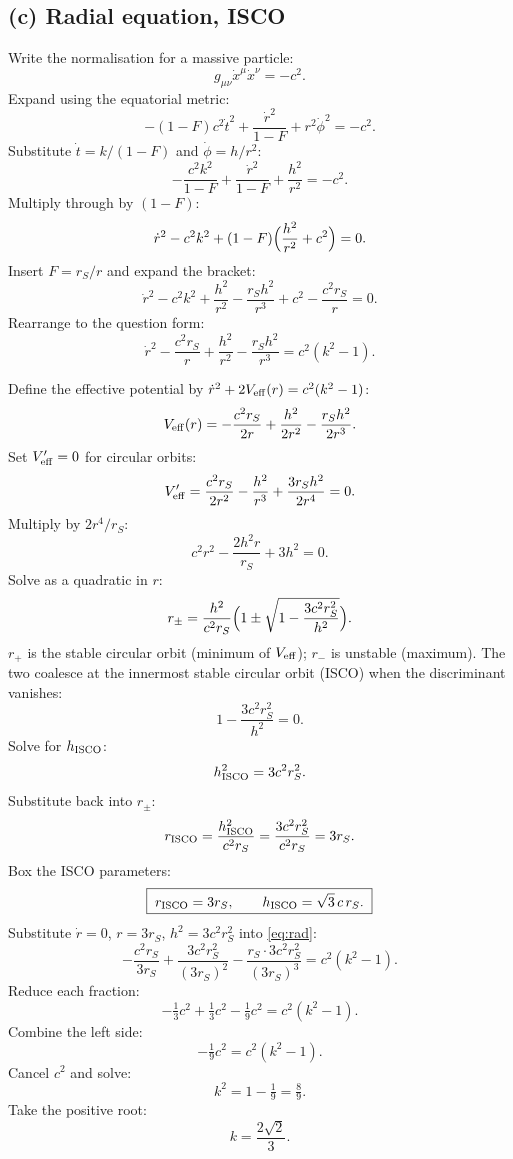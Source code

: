 \documentclass[11pt]{article}
\begin{document}
\subsection*{(c) Radial equation, ISCO}

Write the normalisation for a massive particle:
\[
g_{\mu\nu}\dot x^{\mu}\dot x^{\nu}=-c^{2}.
\]
Expand using the equatorial metric:
\[
-(1-F)c^{2}\dot t^{2}+\frac{\dot r^{2}}{1-F}+r^{2}\dot\phi^{2}=-c^{2}.
\]
Substitute $\dot t=k/(1-F)$ and $\dot\phi=h/r^{2}$:
\[
-\frac{c^{2}k^{2}}{1-F}+\frac{\dot r^{2}}{1-F}+\frac{h^{2}}{r^{2}}=-c^{2}.
\]
Multiply through by $(1-F)$:
\[
\dot r^{2}-c^{2}k^{2}+(1-F)\Bigl(\frac{h^{2}}{r^{2}}+c^{2}\Bigr)=0.
\]
Insert $F=r_{S}/r$ and expand the bracket:
\[
\dot r^{2}-c^{2}k^{2}+\frac{h^{2}}{r^{2}}-\frac{r_{S}h^{2}}{r^{3}}+c^{2}-\frac{c^{2}r_{S}}{r}=0.
\]
Rearrange to the question form:
\begin{equation}
\boxed{\;\dot r^{2}-\frac{c^{2}r_{S}}{r}+\frac{h^{2}}{r^{2}}-\frac{r_{S}h^{2}}{r^{3}}=c^{2}(k^{2}-1).\;}
\label{eq:rad}
\end{equation}

Define the effective potential by $\dot r^{2}+2V_{\rm eff}(r)=c^{2}(k^{2}-1)$:
\[
V_{\rm eff}(r)=-\frac{c^{2}r_{S}}{2r}+\frac{h^{2}}{2r^{2}}-\frac{r_{S}h^{2}}{2r^{3}}.
\]
Set $V'_{\rm eff}=0$ for circular orbits:
\[
V'_{\rm eff}=\frac{c^{2}r_{S}}{2r^{2}}-\frac{h^{2}}{r^{3}}+\frac{3r_{S}h^{2}}{2r^{4}}=0.
\]
Multiply by $2r^{4}/r_{S}$:
\[
c^{2}r^{2}-\frac{2h^{2}r}{r_{S}}+3h^{2}=0.
\]
Solve as a quadratic in $r$:
\[
r_{\pm}=\frac{h^{2}}{c^{2}r_{S}}\Bigl(1\pm\sqrt{1-\frac{3c^{2}r_{S}^{2}}{h^{2}}}\Bigr).
\]
$r_{+}$ is the stable circular orbit (minimum of $V_{\rm eff}$); $r_{-}$ is unstable (maximum).  The two coalesce at the innermost stable circular orbit (ISCO) when the discriminant vanishes:
\[
1-\frac{3c^{2}r_{S}^{2}}{h^{2}}=0.
\]
Solve for $h_{\rm ISCO}$:
\[
h_{\rm ISCO}^{2}=3c^{2}r_{S}^{2}.
\]
Substitute back into $r_{\pm}$:
\[
r_{\rm ISCO}=\frac{h_{\rm ISCO}^{2}}{c^{2}r_{S}}=\frac{3c^{2}r_{S}^{2}}{c^{2}r_{S}}=3r_{S}.
\]
Box the ISCO parameters:
\[
\boxed{\;r_{\rm ISCO}=3r_{S},\qquad h_{\rm ISCO}=\sqrt{3}\,c\,r_{S}.\;}
\]
Substitute $\dot r=0$, $r=3r_{S}$, $h^{2}=3c^{2}r_{S}^{2}$ into \eqref{eq:rad}:
\[
-\frac{c^{2}r_{S}}{3r_{S}}+\frac{3c^{2}r_{S}^{2}}{(3r_{S})^{2}}-\frac{r_{S}\cdot 3c^{2}r_{S}^{2}}{(3r_{S})^{3}}=c^{2}(k^{2}-1).
\]
Reduce each fraction:
\[
-\tfrac{1}{3}c^{2}+\tfrac{1}{3}c^{2}-\tfrac{1}{9}c^{2}=c^{2}(k^{2}-1).
\]
Combine the left side:
\[
-\tfrac{1}{9}c^{2}=c^{2}(k^{2}-1).
\]
Cancel $c^{2}$ and solve:
\[
k^{2}=1-\tfrac{1}{9}=\tfrac{8}{9}.
\]
Take the positive root:
\[
\boxed{\;k=\frac{2\sqrt{2}}{3}.\;}
\]
\end{document}
